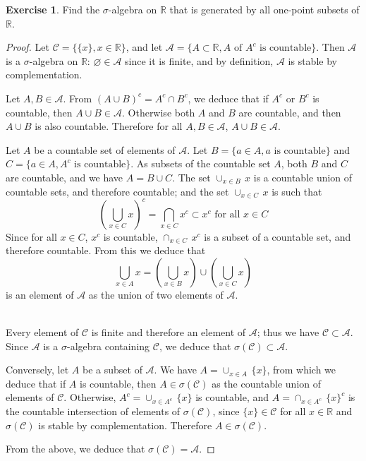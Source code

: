 \documentclass[11pt,a4paper,twoside]{article}
\theoremstyle{definition}
\newcounter{excounter}
\newtheorem{exercise}[excounter]{Exercise}
\begin{document}
\begin{exercise}

  Find the $\sigma$-algebra on $\mathbb{R}$ that is generated by all one-point subsets of $\mathbb{R}$.

\end{exercise}

\begin{proof}

  Let $\mathscr{C} = \big\{ \{ x \}, x \in \mathbb{R} \big\}$, and let $\mathscr{A} = \{ A \subset \mathbb{R}, A \text{ of } A^c \text{ is countable} \}$.
  Then $\mathscr{A}$ is a $\sigma$-algebra on $\mathbb{R}$: $\varnothing \in \mathscr{A}$ since it is finite, and by definition, $\mathscr{A}$ is
  stable by complementation.
  
  Let $A, B \in \mathscr{A}$. From $( A \cup B )^c = A^c \cap B^c$, we deduce that if $A^c$ or $B^c$ is countable, then $A \cup B \in \mathscr{A}$.
  Otherwise both $A$ and $B$ are countable, and then $A \cup B$ is also countable. Therefore for all $A, B \in \mathscr{A}$, $A \cup B \in \mathscr{A}$.

  Let $A$ be a countable set of elements of $\mathscr{A}$. Let $B = \{ a \in A, a \text{ is countable} \}$
  and $C = \{ a \in A, A^c \text{ is countable} \}$. As subsets of the countable set $A$, both $B$ and $C$ are countable, and we have $A = B \cup C$.
  The set $\cup_{x \in B} \,x$ is a countable union of countable sets, and therefore countable; and the set $\cup_{x \in C} \,x$ is such that
  \begin{equation*}
    \left( \bigcup_{x \in C} x \right)^c = \bigcap_{x \in C} x^c \subset x^c \text{ for all } x \in C
  \end{equation*}
  Since for all $x \in C$, $x^c$ is countable, $\cap_{x \in C} \,x^c$ is a subset of a countable set, and therefore countable. From this we deduce that
  \begin{equation*}
    \bigcup_{x \in A} x = \left( \bigcup_{x \in B} x \right) \cup \left( \bigcup_{x \in C} x \right)
  \end{equation*}
  is an element of $\mathscr{A}$ as the union of two elements of $\mathscr{A}$.

  ~\\
  Every element of $\mathscr{C}$ is finite and therefore an element of $\mathscr{A}$; thus we have $\mathscr{C} \subset \mathscr{A}$.
  Since $\mathscr{A}$ is a $\sigma$-algebra containing $\mathscr{C}$, we deduce that $\sigma ( \mathscr{C} ) \subset \mathscr{A}$.

  Conversely, let $A$ be a subset of $\mathscr{A}$. We have $A = \cup_{x \in A} \,\{ x \}$, from which we deduce that if $A$ is countable,
  then $A \in \sigma ( \mathscr{C} )$ as the countable union of elements of $\mathscr{C}$. Otherwise, $A^c = \cup_{x \in A^c} \,\{ x \}$ is countable,
  and $A = \cap_{x \in A^c} \,\{ x \}^c$ is the countable intersection of elements of $\sigma ( \mathscr{C} )$, since $\{ x \} \in \mathscr{C}$ for all $x \in \mathbb{R}$
  and $\sigma ( \mathscr{C} )$ is stable by complementation. Therefore $A \in \sigma ( \mathscr{C} )$.

  From the above, we deduce that $\sigma ( \mathscr{C} ) = \mathscr{A}$.

\end{proof}
\end{document}

